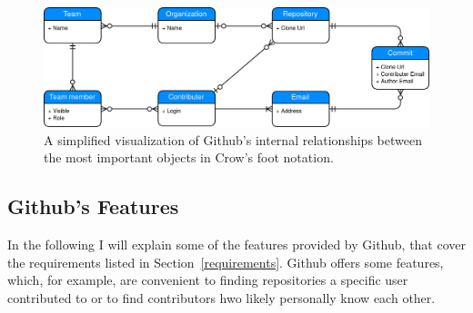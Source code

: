 \begin{figure}[H]
\includegraphics[scale=0.27]{./graphs/github-data-structure}
\centering
\caption{A simplified visualization of Github's internal relationships between the most important objects in Crow's foot notation.}\label{fig:github-relationship}
\end{figure}

\subsection{Github's Features}\label{github-features}
In the following I will explain some of the features provided by Github, that cover the requirements listed in Section~\ref{requirements}.
Github offers some features, which, for example, are convenient to finding repositories a specific user contributed to or to find contributors hwo likely personally know each other.

